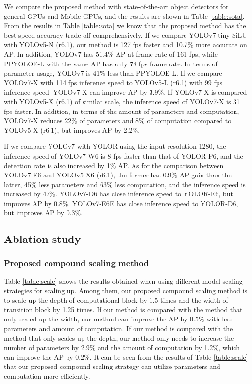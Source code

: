 \documentclass[10pt,twocolumn,letterpaper]{article}
\begin{document}
		We compare the proposed method with state-of-the-art object detectors for general GPUs and Mobile GPUs, and the results are shown in Table \ref{table:sota}. From the results in Table \ref{table:sota} we know that the proposed method has the best speed-accuracy trade-off comprehensively. If we compare YOLOv7-tiny-SiLU with YOLOv5-N (r6.1), our method is 127 fps faster and 10.7\% more accurate on AP.  In addition, YOLOv7 has 51.4\% AP at frame rate of 161 fps, while PPYOLOE-L with the same AP has only 78 fps frame rate. In terms of parameter usage, YOLOv7 is 41\% less than PPYOLOE-L. If we compare YOLOv7-X with 114 fps inference speed to YOLOv5-L (r6.1) with 99 fps inference speed, YOLOv7-X can improve AP by 3.9\%. If YOLOv7-X is compared with YOLOv5-X (r6.1) of similar scale, the inference speed of YOLOv7-X is 31 fps faster. In addition, in terms of the amount of parameters and computation, YOLOv7-X reduces 22\% of parameters and 8\% of computation compared to YOLOv5-X (r6.1), but improves AP by 2.2\%.
		
		\newpage
		
		If we compare YOLOv7 with YOLOR using the input resolution 1280, the inference speed of YOLOv7-W6 is 8 fps faster than that of YOLOR-P6, and the detection rate is also increased by 1\% AP. As for the comparison between YOLOv7-E6 and YOLOv5-X6 (r6.1), the former has 0.9\% AP gain than the latter, 45\% less parameters and 63\% less computation, and the inference speed is increased by 47\%. YOLOv7-D6 has close inference speed to YOLOR-E6, but improves AP by 0.8\%. YOLOv7-E6E has close inference speed to YOLOR-D6, but improves AP by 0.3\%.
		


		
		
		
		\subsection{Ablation study}
		
		
		
		\subsubsection{Proposed compound scaling method}
		
		Table \ref{table:scale} shows the results obtained when using different model scaling strategies for scaling up. Among them, our proposed compound scaling method is to scale up the depth of computational block by 1.5 times and the width of transition block by 1.25 times. If our method is compared with the method that only scaled up the width, our method can improve the AP by 0.5\% with less parameters and amount of computation. If our method is compared with the method that only scales up the depth, our method only needs to increase the number of parameters by 2.9\% and the amount of computation by 1.2\%, which can improve the AP by 0.2\%. It can be seen from the results of Table \ref{table:scale} that our proposed compound scaling strategy can utilize parameters and computation more efficiently.
		
\end{document}
